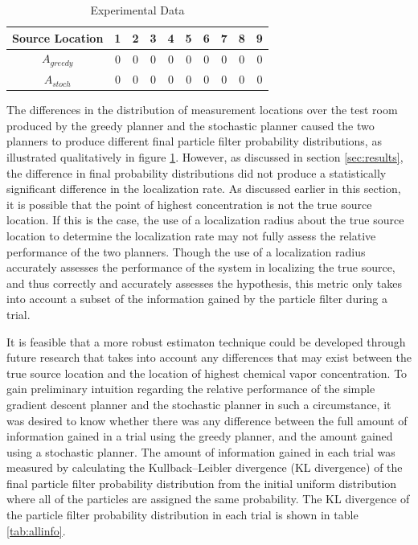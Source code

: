 \documentclass[submit]{aiaa-pretty-modified}
\begin{document}
\begin{table}[htb]
\begin{center}
\begin{tabular}{|c||c||c||c||c||c||c||c||c||c|}
\hline
 Source Location & 1 & 2 & 3 & 4 & 5 & 6 & 7 & 8 & 9 \\
\hline \hline
$A_{greedy}$ & 0 & 0 & 0 & 0 & 0 & 0 & 0 & 0 & 0 \\
\hline
$A_{stoch}$ & 0 & 0 & 0 & 0 & 0 & 0 & 0 & 0 & 0 \\
\hline
\end{tabular}
\caption{Experimental Data \label{tab:paths} }
\end{center}
\end{table}

The differences in the distribution of measurement locations over the test room
produced by the greedy planner and the stochastic planner caused the
two planners
to produce different final particle filter probability distributions,
as illustrated qualitatively in figure \ref{tab:paths}.  However, as
discussed in section \ref{sec:results}, the difference in final
probability distributions did not produce a statistically significant
difference in the localization rate.  As discussed earlier in this
section, it is possible that the point of highest concentration is
not the true source location.  If this is the case, the use of a localization radius about
the true source location
to determine the localization rate may not fully assess the
relative performance of the two planners.  Though the use of a
localization radius accurately
assesses the performance of the system in localizing the true source,
and thus correctly and accurately assesses the hypothesis, this metric only takes
into account a subset of the information gained by the particle filter
during a trial.

It is feasible that a more robust estimaton technique could be developed through
future research that takes into account any differences that may exist
between the true source location and the location of highest chemical
vapor concentration.  To gain preliminary intuition regarding the
relative performance of the simple gradient descent planner and the
stochastic planner in such a circumstance, it was desired to know
whether there was any difference between the full amount of information
gained in a trial using the greedy planner, and the amount gained
using a stochastic planner.  The amount of information gained in each
trial was measured by calculating the Kullback–Leibler divergence (KL
divergence) of
the final particle filter probability distribution from the initial
uniform distribution where all of the particles are assigned the same
probability.  The KL divergence of the particle filter probability
distribution in each trial is shown in table \ref{tab:allinfo}.
\end{document}
